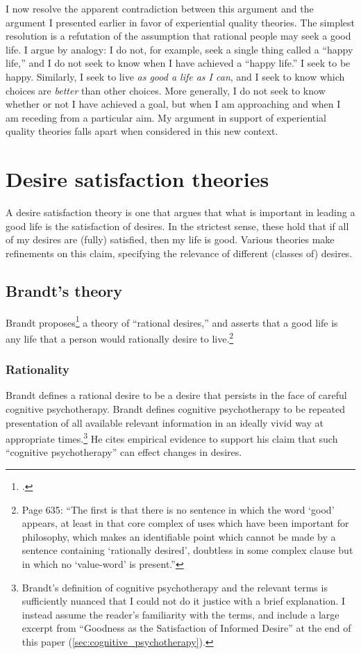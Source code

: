 \documentclass[letterpaper,11pt,twoside]{article}
\begin{document}
    I now resolve the apparent contradiction between this argument and the argument I presented earlier in favor of experiential quality theories.  The simplest resolution is a refutation of the assumption that rational people may seek a good life.  I argue by analogy: I do not, for example, seek a single thing called a ``happy life,'' and I do not seek to know when I have achieved a ``happy life.''  I seek to be happy.  Similarly, I seek to live \emph{as good a life as I can}, and I seek to know which choices are \emph{better} than other choices.  More generally, I do not seek to know whether or not I have achieved a goal, but when I am approaching and when I am receding from a particular aim.  My argument in support of experiential quality theories falls apart when considered in this new context.
    
\section*{Desire satisfaction theories}
  A desire satisfaction theory is one that argues that what is important in leading a good life is the satisfaction of desires.  In the strictest sense, these hold that if all of my desires are (fully) satisfied, then my life is good.  Various theories make refinements on this claim, specifying the relevance of different (classes of) desires.
  \subsection*{Brandt's theory}
    Brandt proposes\footcite{Brandt1998} a theory of ``rational desires,'' and asserts that a good life is any life that a person would rationally desire to live.\footnote{Page 635: ``The first is that there is no sentence in which the word `good' appears, at least in that core complex of uses which have been important for philosophy, which makes an identifiable point which cannot be made by a sentence containing `rationally desired', doubtless in some complex clause but in which no `value-word' is present.''}
    \subsubsection*{Rationality}
      Brandt defines a rational desire to be a desire that persists in the face of careful cognitive psychotherapy.  Brandt defines cognitive psychotherapy to be repeated presentation of all available relevant information in an ideally vivid way at appropriate times.\footnote{Brandt's definition of cognitive psychotherapy and the relevant terms is sufficiently nuanced that I could not do it justice with a brief explanation.  I instead assume the reader's familiarity with the terms, and include a large excerpt from ``Goodness as the Satisfaction of Informed Desire'' at the end of this paper (\autoref{sec:cognitive_psychotherapy}).}  He cites empirical evidence to support his claim that such ``cognitive psychotherapy'' can effect changes in desires.
\end{document}
